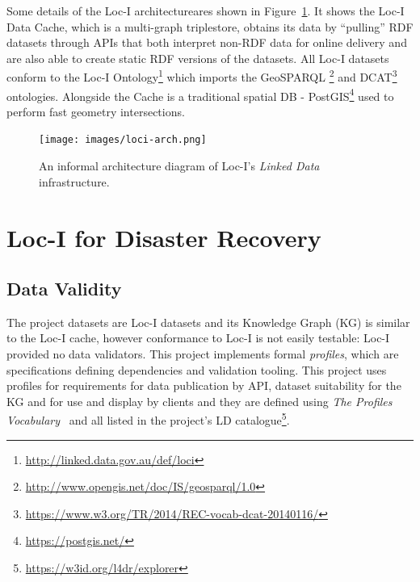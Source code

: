 \documentclass[runningheads]{llncs}
\begin{document}
Some details of the Loc-I architectureares shown in Figure~\ref{fig:loci-arch}. It shows the Loc-I Data Cache, which is a multi-graph triplestore, 
obtains its data by ``pulling'' RDF datasets through APIs that both interpret non-RDF data for online delivery and are also able to create static RDF 
versions of the datasets. All Loc-I datasets conform to the Loc-I Ontology\footnote{\url{http://linked.data.gov.au/def/loci}} which imports the GeoSPARQL
\footnote{\url{http://www.opengis.net/doc/IS/geosparql/1.0}} and DCAT\footnote{\url{https://www.w3.org/TR/2014/REC-vocab-dcat-20140116/}} ontologies. 
Alongside the Cache is a traditional spatial DB - PostGIS\footnote{\url{https://postgis.net/}} used to perform fast geometry intersections.

\begin{figure}[htb]
    \centering
    \texttt{[image: images/loci-arch.png]}
    \caption{An informal architecture diagram of Loc-I's \textit{Linked Data} infrastructure.}
    \label{fig:loci-arch}
\end{figure}

\section{Loc-I for Disaster Recovery}\label{sec:changes}
\subsection{Data Validity}
The project datasets are Loc-I datasets and its Knowledge Graph (KG) is similar to the Loc-I cache, however conformance to Loc-I is not easily
testable: Loc-I provided no data validators. This project implements formal \textit{profiles}, which 
are specifications defining dependencies and validation tooling. This project uses profiles for requirements for data 
publication by API, dataset suitability for the KG and for use and display by clients and they are defined using 
\textit{The Profiles Vocabulary}~\cite{atkinson_profiles_2020} and all listed in the project's LD catalogue\footnote{\label{catalogue} \url{https://w3id.org/l4dr/explorer}}.
\end{document}
